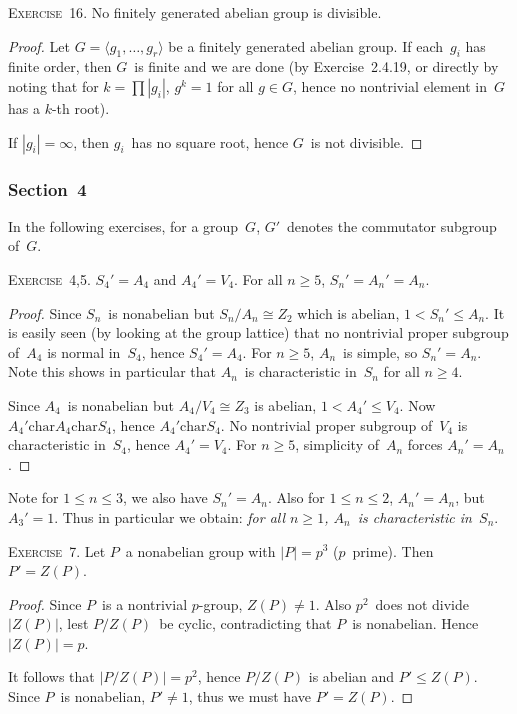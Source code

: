 \documentclass[letterpaper]{article}
\newcommand{\exercise}[1]{\goodbreak\noindent\textsc{Exercise~{#1}.}}
\newcommand{\iso}{\cong}
\newcommand{\subgroup}{\le}
\newcommand{\subgroupne}{<}
\newcommand{\chr}{\mathrel{\mathrm{char}}}
\newcommand{\ord}[1]{|{#1}|}
\newcommand{\gen}[1]{\langle{#1}\rangle}
\begin{document}
\bigskip
\exercise{16}
No finitely generated abelian group is divisible.
\begin{proof}
Let $G=\gen{g_1,\ldots,g_r}$ be a finitely generated abelian group. If each~$g_i$ has finite order, then $G$~is finite and we are done (by Exercise~2.4.19, or directly by noting that for $k=\prod\ord{g_i}$, $g^k=1$ for all $g\in G$, hence no nontrivial element in~$G$ has a $k$-th root).

If $\ord{g_i}=\infty$, then $g_i$~has no square root, hence $G$~is not divisible.
\end{proof}

\subsubsection*{Section~4}
In the following exercises, for a group~$G$, $G'$~denotes the commutator subgroup of~$G$.

\bigskip
\exercise{4,5}
$S_4'=A_4$ and $A_4'=V_4$. For all $n\ge 5$, $S_n'=A_n'=A_n$.
\begin{proof}
Since $S_n$~is nonabelian but $S_n/A_n\iso Z_2$ which is abelian, $1\subgroupne S_n'\subgroup A_n$. It is easily seen (by looking at the group lattice) that no nontrivial proper subgroup of~$A_4$ is normal in~$S_4$, hence $S_4'=A_4$. For $n\ge 5$, $A_n$~is simple, so $S_n'=A_n$. Note this shows in particular that $A_n$~is characteristic in~$S_n$ for all $n\ge4$.

Since $A_4$~is nonabelian but $A_4/V_4\iso Z_3$ is abelian, $1<A_4'\le V_4$. Now $A_4'\chr A_4\chr S_4$, hence $A_4'\chr S_4$. No nontrivial proper subgroup of~$V_4$ is characteristic in~$S_4$, hence $A_4'=V_4$. For $n\ge5$, simplicity of~$A_n$ forces $A_n'=A_n$.
\end{proof}
\noindent Note for $1\le n\le 3$, we also have $S_n'=A_n$. Also for $1\le n\le 2$, $A_n'=A_n$, but $A_3'=1$. Thus in particular we obtain: \emph{for all $n\ge 1$, $A_n$~is characteristic in~$S_n$}.

\bigskip
\exercise{7}
Let $P$~a nonabelian group with $\ord{P}=p^3$ ($p$~prime). Then $P'=Z(P)$.
\begin{proof}
Since $P$~is a nontrivial $p$-group, $Z(P)\ne1$. Also $p^2$~does not divide~$\ord{Z(P)}$, lest $P/Z(P)$~be cyclic, contradicting that $P$~is nonabelian. Hence $\ord{Z(P)}=p$.

It follows that $\ord{P/Z(P)}=p^2$, hence $P/Z(P)$ is abelian and $P'\subgroup Z(P)$. Since $P$~is nonabelian, $P'\ne1$, thus we must have $P'=Z(P)$.
\end{proof}
\end{document}
